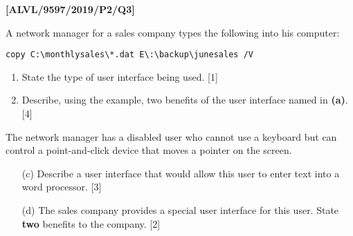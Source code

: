 \item \textbf{{[}ALVL/9597/2019/P2/Q3{]} }

A network manager for a sales company types the following into his
computer:

\texttt{copy C:\textbackslash monthlysales\textbackslash{*}.dat
E\textbackslash :\textbackslash backup\textbackslash junesales
/V}
\begin{enumerate}
\item State the type of user interface being used. \hfill{}{[}1{]}
\item Describe, using the example, two benefits of the user interface named
in \textbf{(a)}. \hfill{}{[}4{]}
\end{enumerate}
The network manager has a disabled user who cannot use a keyboard
but can control a point-and-click device that moves a pointer on the
screen.
\begin{enumerate}
\item[(c)]  Describe a user interface that would allow this user to enter text
into a word processor. \hfill{}{[}3{]}
\item[(d)]  The sales company provides a special user interface for this user.
State\textbf{ two} benefits to the company. \hfill{}{[}2{]}
\end{enumerate}